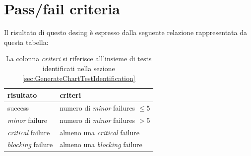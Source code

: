 \section{Pass/fail criteria}
Il risultato di questo desing \`e
espresso dalla seguente relazione rappresentata da questa tabella: 
\begin{table}[h!]
  \begin{center}
    \begin{tabular}{| l | l |}
    \hline
    \textbf{risultato} & \textbf{criteri} \\
	\hline    
	success & numero di \emph{minor} failures $\leq 5$   \\
    \hline
    \emph{minor} failure & numero di \emph{minor} failures $> 5$ \\
    \hline
    \emph{critical} failure & almeno una \emph{critical} failure \\
    \hline
    \emph{blocking} failure & almeno una \emph{blocking} failure \\
    \hline
    \end{tabular}
  \end{center}
	\caption{La colonna \emph{criteri} si riferisce all'insieme di tests 
	identificati nella sezione \ref{sec:GenerateChartTestIdentification}}
\end{table}
